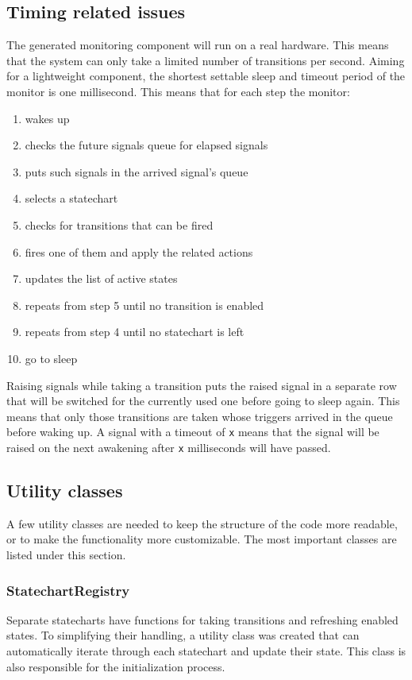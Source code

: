 {  \subsection{Timing related issues}
The generated monitoring component will run on a real hardware. This means that the system can only take a limited number of transitions per second. Aiming for a lightweight component, the shortest settable sleep and timeout period of the monitor is one millisecond. This means that for each step the monitor:
\begin{enumerate}
  \item wakes up
  \item checks the future signals queue for elapsed signals
  \item puts such signals in the arrived signal's queue
  \item selects a statechart
  \item checks for transitions that can be fired
  \item fires one of them and apply the related actions
  \item updates the list of active states
  \item repeats from step 5 until no transition is enabled
  \item repeats from step 4 until no statechart is left
  \item go to sleep
\end{enumerate}
Raising signals while taking a transition puts the raised signal in a separate row that will be switched for the currently used one before going to sleep again. This means that only those transitions are taken whose triggers arrived in the queue before waking up. A signal with a timeout of \verb!x! means that the signal will be raised on the next awakening after \verb!x! milliseconds will have passed.
  \subsection{Utility classes}
A few utility classes are needed to keep the structure of the code more readable, or to make the functionality more customizable. The most important classes are listed under this section.
    \subsubsection{StatechartRegistry}
Separate statecharts have functions for taking transitions and refreshing enabled states. To simplifying their handling, a utility class was created that can automatically iterate through each statechart and update their state. This class is also responsible for the initialization process.
}
